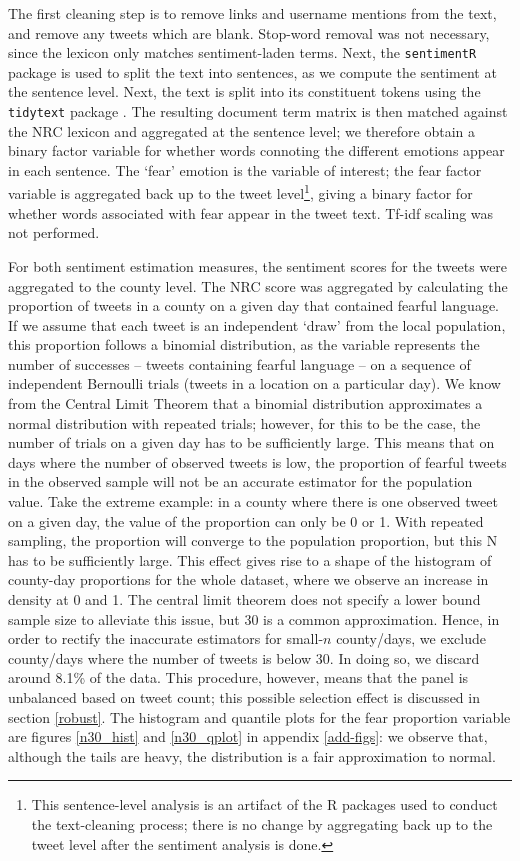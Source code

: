 \documentclass{article}
\begin{document}
The first cleaning step is to remove links and username mentions from the text, and remove any tweets which are blank. Stop-word removal was not necessary, since the lexicon only matches sentiment-laden terms. Next, the \texttt{sentimentR} package \parencite{rinkerSentimentr2018} is used to split the text into sentences, as we compute the sentiment at the sentence level. Next, the text is split into its constituent tokens using the \texttt{tidytext} package \parencite{silgeTextMiningTidy2017}. The resulting document term matrix is then matched against the NRC lexicon and aggregated at the sentence level; we therefore obtain a binary factor variable for whether words connoting the different emotions appear in each sentence. The `fear' emotion is the variable of interest; the fear factor variable is aggregated back up to the tweet level\footnote{This sentence-level analysis is an artifact of the R packages used to conduct the text-cleaning process; there is no change by aggregating back up to the tweet level after the sentiment analysis is done.}, giving a binary factor for whether words associated with fear appear in the tweet text.  Tf-idf scaling was not performed.

For both sentiment estimation measures, the sentiment scores for the tweets were aggregated to the county level. The NRC score was aggregated by calculating the proportion of tweets in a county on a given day that contained fearful language. If we assume that each tweet is an independent `draw' from the local population, this proportion follows a  binomial distribution, as the variable represents the number of successes -- tweets containing fearful language -- on a sequence of independent Bernoulli trials (tweets in a location on a particular day). We know from the Central Limit Theorem that a binomial distribution approximates a normal distribution with repeated trials; however, for this to be the case, the number of trials on a given day has to be sufficiently large. This means that on days  where the number of observed tweets is low, the proportion of fearful tweets in the observed sample will not be an accurate estimator for the population value. Take the extreme example: in a county where there is one observed tweet on a given day, the value of the proportion can only be 0 or 1. With repeated sampling, the proportion will converge to the population proportion, but this N has to be sufficiently large. This effect gives rise to a shape of the histogram of county-day proportions for the whole dataset, where we observe an increase in density at 0 and 1. The central limit theorem does not specify a lower bound sample size to alleviate this issue, but 30 is a common approximation. Hence, in order to rectify the inaccurate estimators for small-\(n\) county/days, we exclude county/days where the number of tweets is below 30. In doing so, we discard around 8.1\% of the data. This procedure, however, means that the panel is unbalanced based on tweet count; this possible selection effect is discussed in section \ref{robust}. The histogram and quantile plots for the fear proportion variable are figures \ref{n30_hist} and \ref{n30_qplot} in appendix \ref{add-figs}: we observe that, although the tails are heavy, the distribution is a fair approximation to normal.
\end{document}
